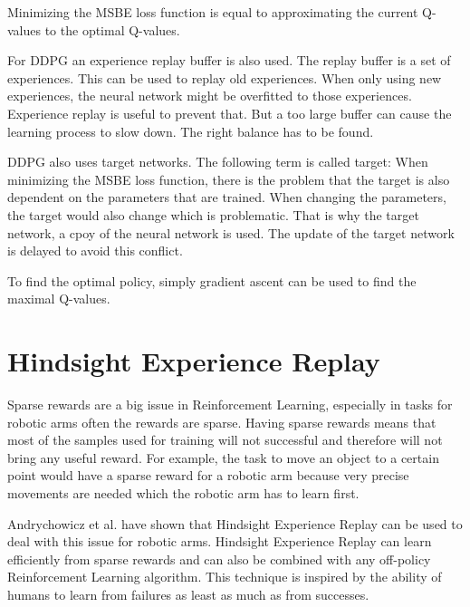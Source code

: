 Minimizing the MSBE loss function is equal to approximating the current Q-values to the optimal Q-values.

For DDPG an experience replay buffer is also used. The replay buffer is a set of experiences. This can be used to replay old experiences. When only using new experiences, the neural network might be overfitted to those experiences. Experience replay is useful to prevent that. But a too large buffer can cause the learning process to slow down. The right balance has to be found.

DDPG also uses target networks. The following term is called target:
When minimizing the MSBE loss function, there is the problem that the target is also dependent on the parameters that are trained. When changing the parameters, the target would also change which is problematic. That is why the target network, a cpoy of the neural network is used. The update of the target network is delayed to avoid this conflict.

To find the optimal policy, simply gradient ascent can be used to find the maximal Q-values.





\section{Hindsight Experience Replay}



Sparse rewards are a big issue in Reinforcement Learning, especially in tasks for robotic arms often the rewards are sparse. Having sparse rewards means that most of the samples used for training will not successful and therefore will not bring any useful reward. For example, the task to move an object to a certain point would have a sparse reward for a robotic arm because very precise movements are needed which the robotic arm has to learn first.
 
Andrychowicz et al. have shown that Hindsight Experience Replay can be used to deal with this issue for robotic arms. 
Hindsight Experience Replay can learn efficiently from sparse rewards and can also be combined with any off-policy Reinforcement Learning algorithm.
This technique is inspired by the ability of humans to learn from failures as least as much as from successes.

